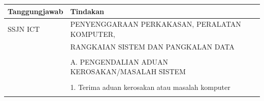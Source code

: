 \documentclass[
]{article}
\begin{document}
\begin{longtable}[]{@{}ll@{}}
\toprule
\begin{minipage}[b]{0.23\columnwidth}\raggedright
Tanggungjawab\strut
\end{minipage} & \begin{minipage}[b]{0.71\columnwidth}\raggedright
Tindakan\strut
\end{minipage}\tabularnewline
\midrule
\endhead
\begin{minipage}[t]{0.23\columnwidth}\raggedright
SSJN ICT\strut
\end{minipage} & \begin{minipage}[t]{0.71\columnwidth}\raggedright
PENYENGGARAAN PERKAKASAN, PERALATAN KOMPUTER,\strut
\end{minipage}\tabularnewline
\begin{minipage}[t]{0.23\columnwidth}\raggedright
\strut
\end{minipage} & \begin{minipage}[t]{0.71\columnwidth}\raggedright
RANGKAIAN SISTEM DAN PANGKALAN DATA\strut
\end{minipage}\tabularnewline
\begin{minipage}[t]{0.23\columnwidth}\raggedright
\strut
\end{minipage} & \begin{minipage}[t]{0.71\columnwidth}\raggedright
\strut
\end{minipage}\tabularnewline
\begin{minipage}[t]{0.23\columnwidth}\raggedright
\strut
\end{minipage} & \begin{minipage}[t]{0.71\columnwidth}\raggedright
A. PENGENDALIAN ADUAN KEROSAKAN/MASALAH SISTEM\strut
\end{minipage}\tabularnewline
\begin{minipage}[t]{0.23\columnwidth}\raggedright
\strut
\end{minipage} & \begin{minipage}[t]{0.71\columnwidth}\raggedright
\strut
\end{minipage}\tabularnewline
\begin{minipage}[t]{0.23\columnwidth}\raggedright
\strut
\end{minipage} & \begin{minipage}[t]{0.71\columnwidth}\raggedright
1. Terima aduan kerosakan atau masalah komputer\strut
\end{minipage}\tabularnewline
\begin{minipage}[t]{0.23\columnwidth}\raggedright

\end{minipage}
\end{longtable}
\end{document}

